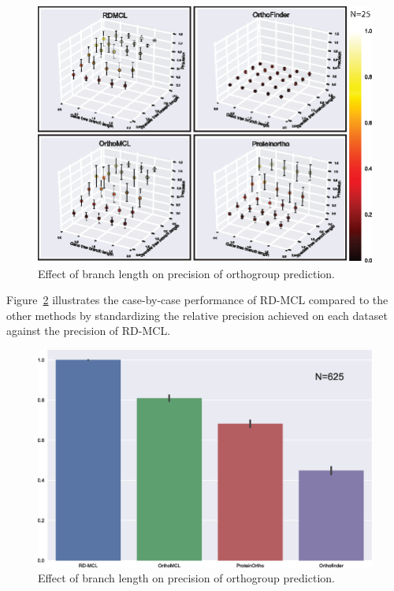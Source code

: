 \documentclass[twocolumn]{bmcart}%
\begin{document}
\begin{figure}[t]
  \begin{center}
  \includegraphics[height=0.25\textheight]{../figures/branch_len_3D_scatter.eps}
\end{center}
\caption{Effect of branch length on precision of orthogroup prediction.}
\label{fig:branch_len_3d}
\end{figure}

Figure~\ref{fig:branch_len_std} illustrates the case-by-case performance of RD-MCL compared to the other methods by standardizing the relative precision achieved on each dataset against the precision of RD-MCL\@.

\begin{figure}[t]
  \begin{center}
  \includegraphics[height=0.22\textheight]{../figures/branch_len_bargraph.eps}
\end{center}
\caption{Effect of branch length on precision of orthogroup prediction.}
\label{fig:branch_len_std}
\end{figure}
\end{document}

